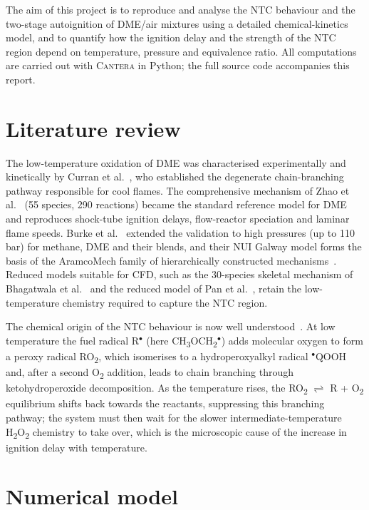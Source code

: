 \documentclass[11pt,a4paper]{article}
\begin{document}
The aim of this project is to reproduce and analyse the NTC behaviour and the
two-stage autoignition of DME/air mixtures using a detailed chemical-kinetics
model, and to quantify how the ignition delay and the strength of the NTC region
depend on temperature, pressure and equivalence ratio. All computations are
carried out with \textsc{Cantera} in Python; the full source code accompanies
this report.

\section{Literature review}
The low-temperature oxidation of DME was characterised experimentally and
kinetically by Curran et al.~\cite{curran2000}, who established the degenerate
chain-branching pathway responsible for cool flames. The comprehensive mechanism
of Zhao et al.~\cite{zhao2008} (55 species, 290 reactions) became the standard
reference model for DME and reproduces shock-tube ignition delays, flow-reactor
speciation and laminar flame speeds. Burke et al.~\cite{burke2015} extended the
validation to high pressures (up to 110 bar) for methane, DME and their blends,
and their NUI Galway model forms the basis of the AramcoMech family of
hierarchically constructed mechanisms~\cite{metcalfe2013}. Reduced models
suitable for CFD, such as the 30-species skeletal mechanism of Bhagatwala et
al.~\cite{bhagatwala2015} and the reduced model of Pan et al.~\cite{pan2015},
retain the low-temperature chemistry required to capture the NTC region.

The chemical origin of the NTC behaviour is now well
understood~\cite{westbrook2000,griffiths1995}. At low temperature the fuel
radical R$^{\bullet}$ (here CH\textsubscript{3}OCH\textsubscript{2}$^{\bullet}$)
adds molecular oxygen to form a peroxy radical RO\textsubscript{2}, which
isomerises to a hydroperoxyalkyl radical $^{\bullet}$QOOH and, after a second
O\textsubscript{2} addition, leads to chain branching through ketohydroperoxide
decomposition. As the temperature rises, the
RO\textsubscript{2} $\rightleftharpoons$ R + O\textsubscript{2} equilibrium
shifts back towards the reactants, suppressing this branching pathway; the system
must then wait for the slower intermediate-temperature
H\textsubscript{2}O\textsubscript{2} chemistry to take over, which is the
microscopic cause of the increase in ignition delay with temperature.

\section{Numerical model}
\end{document}
